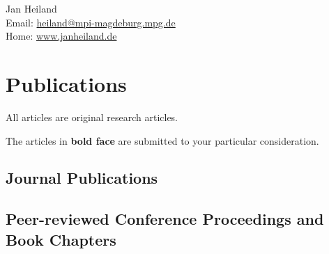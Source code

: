 \documentclass[11pt, a4paper]{article} %
\begin{document}
\sffamily

{\LARGE Jan Heiland}\\[1cm] %
Email: \href{mailto:heiland@mpi-magdeburg.mpg.de}{heiland@mpi-magdeburg.mpg.de}\\ %
Home: \href{http://www.janheiland.de}{www.janheiland.de}\\[.3in] %



\section*{Publications}

All articles are original research articles.

The articles in \textbf{bold face} are submitted to your particular consideration.

\vspace{.1in}
\subsection*{Journal Publications}


\vspace{.1in}
\subsection*{Peer-reviewed Conference Proceedings and Book Chapters}

\end{document}
